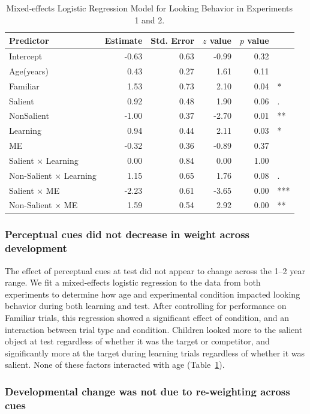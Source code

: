 \documentclass[man,floatsintext]{apa6}
\begin{document}
\begin{table}[!t]
\centering
\caption{Mixed-effects Logistic Regression Model for Looking Behavior in Experiments 1 and 2.} 
\label{tab:model_table}
\begin{tabular}{lrrrrl}
 Predictor & Estimate & Std. Error & $z$ value & $p$ value &  \\ 
  \hline
Intercept & -0.63 & 0.63 & -0.99 & 0.32 &  \\ 
  Age(years) & 0.43 & 0.27 & 1.61 & 0.11 &  \\ 
  Familiar & 1.53 & 0.73 & 2.10 & 0.04 & * \\ 
  Salient & 0.92 & 0.48 & 1.90 & 0.06 & . \\ 
  NonSalient & -1.00 & 0.37 & -2.70 & 0.01 & ** \\ 
  Learning & 0.94 & 0.44 & 2.11 & 0.03 & * \\ 
  ME & -0.32 & 0.36 & -0.89 & 0.37 &  \\ 
  Salient $\times$ Learning & 0.00 & 0.84 & 0.00 & 1.00 &  \\ 
  Non-Salient $\times$ Learning & 1.15 & 0.65 & 1.76 & 0.08 & . \\ 
  Salient $\times$ ME & -2.23 & 0.61 & -3.65 & 0.00 & *** \\ 
  Non-Salient $\times$ ME & 1.59 & 0.54 & 2.92 & 0.00 & ** \\ 
   \hline
\end{tabular}
\end{table}
\subsubsection{Perceptual cues did not decrease in weight across development}

The effect of perceptual cues at test did not appear to change across the 1--2 year range. We fit a mixed-effects logistic regression to the data from both experiments to determine how age and experimental condition impacted looking behavior during both learning and test. After controlling for performance on Familiar trials, this regression showed a significant effect of condition, and an interaction between trial type and condition. Children looked more to the salient object at test regardless of whether it was the target or competitor, and significantly more at the target during learning trials regardless of whether it was salient. None of these factors interacted with age (Table~\ref{tab:model_table}). 

\subsubsection{Developmental change was not due to re-weighting across cues} 
\end{document}
